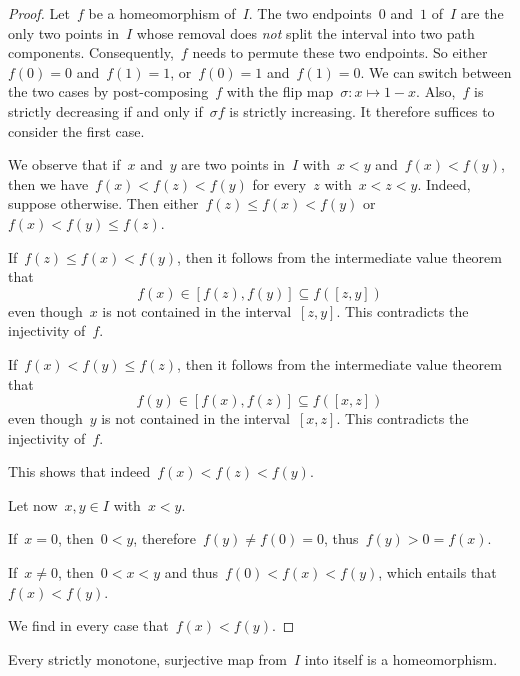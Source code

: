 \begin{proof}
	Let~$f$ be a homeomorphism of~$I$.
	The two endpoints~$0$ and~$1$ of~$I$ are the only two points in~$I$ whose removal does \emph{not} split the interval into two path components.
	Consequently,~$f$ needs to permute these two endpoints.
	So either~$f(0) = 0$ and~$f(1) = 1$, or~$f(0) = 1$ and~$f(1) = 0$.
	We can switch between the two cases by post-composing~$f$ with the flip map~$σ \colon x \mapsto 1 - x$.
	Also,~$f$ is strictly decreasing if and only if~$σ f$ is strictly increasing.
	It therefore suffices to consider the first case.

	We observe that if~$x$ and~$y$ are two points in~$I$ with~$x < y$ and~$f(x) < f(y)$, then we have~$f(x) < f(z) < f(y)$ for every~$z$ with~$x < z < y$.
	Indeed, suppose otherwise.
	Then either~$f(z) ≤ f(x) < f(y)$ or~$f(x) < f(y) ≤ f(z)$.
	\begin{itemize*}

		\item
			If~$f(z) ≤ f(x) < f(y)$, then it follows from the intermediate value theorem that
			\[
				f(x) ∈ [f(z), f(y)] ⊆ f([z, y])
			\]
			even though~$x$ is not contained in the interval~$[z, y]$.
			This contradicts the injectivity of~$f$.

		\item
			If~$f(x) < f(y) ≤ f(z)$, then it follows from the intermediate value theorem that
			\[
				f(y) ∈ [f(x), f(z)] ⊆ f([x, z])
			\]
			even though~$y$ is not contained in the interval~$[x, z]$.
			This contradicts the injectivity of~$f$.

	\end{itemize*}
	This shows that indeed~$f(x) < f(z) < f(y)$.

	Let now~$x, y ∈ I$ with~$x < y$.
	\begin{itemize*}
	
		\item
			If~$x = 0$, then~$0 < y$, therefore~$f(y) ≠ f(0) = 0$, thus~$f(y) > 0 = f(x)$.

		\item
			If~$x ≠ 0$, then~$0 < x < y$ and thus~$f(0) < f(x) < f(y)$, which entails that~$f(x) < f(y)$.

	\end{itemize*}
	We find in every case that~$f(x) < f(y)$.
\end{proof}

\begin{lemma}
	Every strictly monotone, surjective map from~$I$ into itself is a homeomorphism.
\end{lemma}

